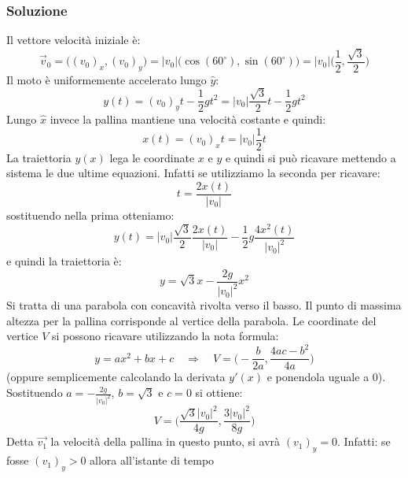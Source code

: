 \documentclass[12pt,a4paper]{book}
\begin{document}
\subsubsection*{Soluzione}
Il vettore velocità iniziale è:
%
\begin{equation*}
\vec{v}_0=\big( (v_0)_x, (v_0)_y \big)= |v_0| \big( \cos (60^\circ), \sin(60^\circ)\big) = |v_0| \big(\frac{1}{2}, \frac{\sqrt{3}}{2}\big) 
\end{equation*}
%
Il moto è uniformemente accelerato lungo $\hat{y}$:
%
\begin{equation*}
y(t)=(v_0)_y t - \frac{1}{2} g t^2 = |v_0| \frac{\sqrt{3}}{2}t - \frac{1}{2} g t^2
\end{equation*}
%
Lungo $\hat{x}$ invece la pallina mantiene una velocità costante e quindi:
%
\begin{equation*}
x(t)=(v_0)_x t=|v_0| \frac{1}{2}t 
\end{equation*}
%
La traiettoria $y(x)$ lega le coordinate $x$ e $y$ e quindi si può ricavare mettendo a sistema le due ultime equazioni. Infatti se utilizziamo la seconda per ricavare: 
%
\begin{equation*}
t=\frac{2x(t)}{|v_0|}
\end{equation*}
%
sostituendo nella prima otteniamo:
%
\begin{equation*}
y(t)= |v_0| \frac{\sqrt{3}}{2} \frac{2 x(t)}{|v_0|} - \frac{1}{2} g \frac{4 x^2(t)}{|v_0|^2}
\end{equation*}
%
e quindi la traiettoria è: 
%
\begin{equation*}
y= \sqrt{3} x - \frac{2 g}{|v_0|^2} x^2
\end{equation*}
%
Si tratta di una parabola con concavità rivolta verso il basso. Il punto di massima altezza per la pallina corrisponde al vertice della parabola. Le coordinate del vertice $V$ si possono ricavare utilizzando la nota formula:
%
\begin{equation*}
y= ax^2 + bx + c \quad \Rightarrow \quad V=\big(-\frac{b}{2a}, \frac{4ac - b^2}{4a} \big)
\end{equation*}
%
(oppure semplicemente calcolando la derivata $y'(x)$ e ponendola uguale a $0$). Sostituendo $a=- \frac{2 g}{|v_0|^2}$, $b=\sqrt{3}$ e $c=0$ si ottiene: 
%
\begin{equation*}
V=\big(\frac{\sqrt{3}|v_0|^2}{4g}, \frac{3|v_0|^2}{8g}\big)
\end{equation*}
%
Detta $\vec{v_1}$ la velocità della pallina in questo punto, si avrà $(v_1)_y=0$. Infatti: se fosse $(v_1)_y>0$ allora all'istante di tempo 
\end{document}
